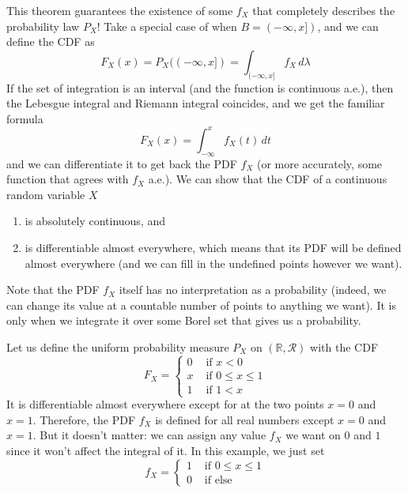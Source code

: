     This theorem guarantees the existence of some $f_X$ that completely describes the probability law $P_X$! Take a special case of when $B = (-\infty, x])$, and we can define the CDF as 
    \begin{equation}
      F_X (x) = P_X ((-\infty, x]) = \int_{(-\infty, x]} f_X \, d\lambda
    \end{equation}
    If the set of integration is an interval (and the function is continuous a.e.), then the Lebesgue integral and Riemann integral coincides, and we get the familiar formula 
    \begin{equation}
      F_X (x) = \int_{-\infty}^x f_X (t)\,dt
    \end{equation}
    and we can differentiate it to get back the PDF $f_X$ (or more accurately, some function that agrees with $f_X$ a.e.). We can show that the CDF of a continuous random variable $X$
    \begin{enumerate}
      \item is absolutely continuous, and 
      \item is differentiable almost everywhere, which means that its PDF will be defined almost everywhere (and we can fill in the undefined points however we want). 
    \end{enumerate}
    Note that the PDF $f_X$ itself has no interpretation as a probability (indeed, we can change its value at a countable number of points to anything we want). It is only when we integrate it over some Borel set that gives us a probability. 

    \begin{example}
      Let us define the uniform probability measure $P_X$ on $(\mathbb{R}, \mathcal{R})$ with the CDF 
      \begin{equation}
        F_X = \begin{cases} 0 & \text{ if } x < 0 \\
        x & \text{ if } 0 \leq x \leq 1 \\
        1 & \text{ if } 1 < x \end{cases}
      \end{equation}
      It is differentiable almost everywhere except for at the two points $x = 0$ and $x = 1$. Therefore, the PDF $f_X$ is defined for all real numbers except $x = 0$ and $x = 1$. But it doesn't matter: we can assign any value $f_X$ we want on $0$ and $1$ since it won't affect the integral of it. In this example, we just set 
      \begin{equation}
        f_X = \begin{cases} 1 & \text{ if } 0 \leq x \leq 1 \\
        0 & \text{ if else} \end{cases} 
      \end{equation}
    \end{example}

